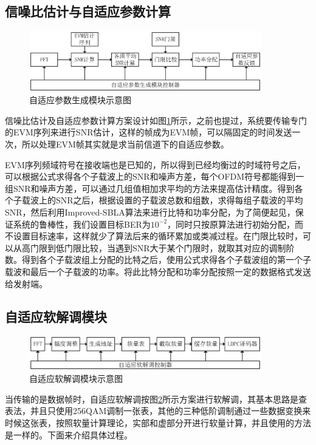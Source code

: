 \subsection{信噪比估计与自适应参数计算}
\begin{figure}[htbp]
\centering
\includegraphics[width=0.9\textwidth]{figures/chapter-5/AdaptiveParameterGenerator.eps}
\caption{自适应参数生成模块示意图}
\label{fig:AdaptiveParameterGenerator}
\end{figure}
信噪比估计及自适应参数计算方案设计如图\ref{fig:AdaptiveParameterGenerator}所示，之前也提过，系统要传输专门的EVM序列来进行SNR估计，这样的帧成为EVM帧，可以隔固定的时间发送一次，所以处理EVM帧其实就是求当前信道下的自适应参数。

EVM序列频域符号在接收端也是已知的，所以得到已经均衡过的时域符号之后，可以根据公式求得各个子载波上的SNR和噪声方差，每个OFDM符号都能得到一组SNR和噪声方差，可以通过几组值相加求平均的方法来提高估计精度。得到各个子载波上的SNR之后，根据设置的子载波总数和组数，求得每组子载波的平均SNR，然后利用Improved-SBLA算法来进行比特和功率分配，为了简便起见，保证系统的鲁棒性，我们设置目标BER为$10^{-2}$，同时只按原算法进行初始分配，而不设置目标速率，这样就少了算法后来的循环累加或类减过程。在门限比较时，可以从高门限到低门限比较，当遇到SNR大于某个门限时，就取其对应的调制阶数。得到各个子载波组上分配的比特之后，使用公式求得各个子载波组的第一个子载波和最后一个子载波的功率。将此比特分配和功率分配按照一定的数据格式发送给发射端。
\subsection{自适应软解调模块}
\begin{figure}[htbp]
\centering
\includegraphics[width=0.9\textwidth]{figures/chapter-5/AdaptiveDemodulation.eps}
\caption{自适应软解调模块示意图}
\label{fig:AdaptiveDemodulation}
\end{figure}
当传输的是数据帧时，自适应软解调按图\ref{fig:AdaptiveDemodulation}所示方案进行软解调，其基本思路是查表法，并且只使用256QAM调制一张表，其他的三种低阶调制通过一些数据变换来时候这张表，按照软量计算理论，实部和虚部分开进行软量计算，并且使用的方法是一样的。下面来介绍具体过程。

